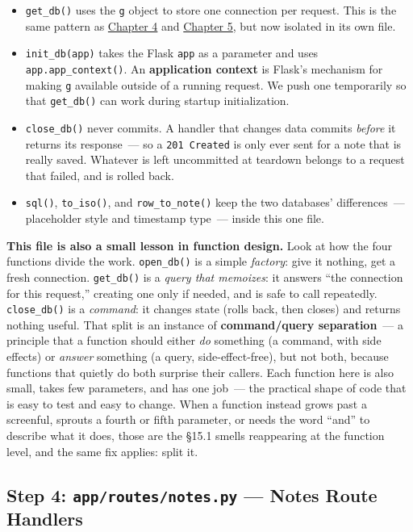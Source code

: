 \begin{itemize}
\tightlist
\item
  \texttt{get\_db()} uses the \texttt{g} object to store one connection per request. This is the same pattern as \hyperref[ch:04-request-handling-paths]{Chapter 4} and \hyperref[ch:05-internal-request-execution]{Chapter 5}, but now isolated in its own file.
\item
  \texttt{init\_db(app)} takes the Flask \texttt{app} as a parameter and uses \texttt{app.app\_context()}. An \textbf{application context} is Flask's mechanism for making \texttt{g} available outside of a running request. We push one temporarily so that \texttt{get\_db()} can work during startup initialization.
\item
  \texttt{close\_db()} never commits. A handler that changes data commits \emph{before} it returns its response~--- so a \texttt{201\ Created} is only ever sent for a note that is really saved. Whatever is left uncommitted at teardown belongs to a request that failed, and is rolled back.
\item
  \texttt{sql()}, \texttt{to\_iso()}, and \texttt{row\_to\_note()} keep the two databases' differences~--- placeholder style and timestamp type~--- inside this one file.
\end{itemize}

\noindent{}\textbf{This file is also a small lesson in function design.} Look at how the four functions divide the work. \texttt{open\_db()} is a simple \emph{factory}: give it nothing, get a fresh connection. \texttt{get\_db()} is a \emph{query that memoizes}: it answers ``the connection for this request,'' creating one only if needed, and is safe to call repeatedly. \texttt{close\_db()} is a \emph{command}: it changes state (rolls back, then closes) and returns nothing useful. That split is an instance of \textbf{command/query separation}~--- a principle that a function should either \emph{do} something (a command, with side effects) or \emph{answer} something (a query, side-effect-free), but not both, because functions that quietly do both surprise their callers. Each function here is also small, takes few parameters, and has one job~--- the practical shape of code that is easy to test and easy to change. When a function instead grows past a screenful, sprouts a fourth or fifth parameter, or needs the word ``and'' to describe what it does, those are the §15.1 smells reappearing at the function level, and the same fix applies: split it.

\subsection*{\texorpdfstring{Step 4:
\texttt{app/}\allowbreak{}\texttt{routes/}\allowbreak{}\texttt{notes.py}
--- Notes Route Handlers}{Step 4:  --- Notes Route Handlers}}\label{15-structuring-the-application:step-4-approutesnotespy--notes-route-handlers}


